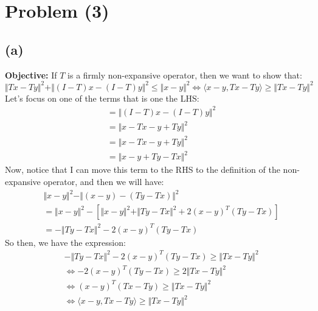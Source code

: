 \documentclass[]{article}
\begin{document}
\section*{Problem (3)}
    \subsection*{(a)}
        \textbf{Objective: } If $T$ is a firmly non-expansive operator, then we want to show that: 
        $$
            \Vert Tx - Ty\Vert^2
            + \Vert (I - T)x - (I - T)y\Vert^2
            \le \Vert x - y\Vert^2
            \iff
            \langle x- y, Tx - Ty\rangle \ge 
            \Vert Tx - Ty\Vert^2
        $$
        Let's focus on one of the terms that is one the LHS: 
        \begin{align*}\tag{3a1}\label{eqn:3a1}
            &=\Vert (I - T)x - (I - T)y\Vert^2 
            \\
            &=\Vert x - Tx - y + Ty\Vert^2
            \\
            &= \Vert x - Tx - y + Ty\Vert^2
            \\
            &=
            \Vert x - y + Ty - Tx\Vert^2
        \end{align*}
        Now, notice that I can move this term to the RHS to the definition of the non-expansive operator, and then we will have: 
        \begin{align*}\tag{3a2}\label{eqn:3a2}
            &\Vert x - y\Vert^2 - \Vert (x - y) - (Ty - Tx)\Vert^2
            \\
            &= 
            \Vert x - y\Vert^2 - \left\lbrack
                \Vert x - y\Vert^2
                + 
                \Vert Ty - Tx\Vert^2
                + 
                2(x - y)^T(Ty - Tx)
            \right\rbrack
            \\
            &= 
            -\Vert Ty - Tx\Vert^2 - 2(x - y)^T(Ty - Tx)
        \end{align*}
        So then, we have the expression: 
        \begin{align*}\tag{3a3}\label{eqn:3a3}
            & -\Vert Ty - Tx\Vert^2 - 2(x - y)^T(Ty - Tx) \ge 
            \Vert Tx - Ty\Vert^2
            \\
            &\iff -2(x - y)^T(Ty - Tx) \ge 2 \Vert Tx - Ty\Vert^2
            \\
            &\iff 
            (x - y)^T(Tx - Ty) \ge \Vert Tx - Ty\Vert^2
            \\
            &
            \iff 
            \langle x - y, Tx - Ty\rangle 
            \ge 
            \Vert Tx - Ty\Vert^2
        \end{align*}
\end{document}
